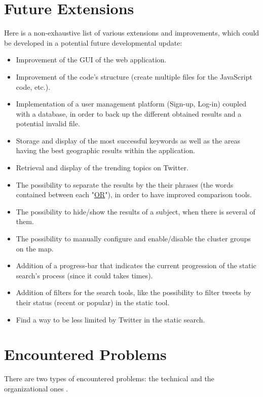 \documentclass[a4paper,11pt]{report}
\begin{document}
\section{Future Extensions}
Here is a non-exhaustive list of various extensions and improvements, which could be developed in a potential future developmental update:
\begin{itemize}
	\item Improvement of the GUI of the web application.
	\item Improvement of the code's structure (create multiple files for the JavaScript code, etc.).
	\item Implementation of a user management platform (Sign-up, Log-in) coupled with a database, in order to back up the different obtained results and a potential invalid file.
	\item Storage and display of the most successful keywords as well as the areas having the best geographic results within the application.
	\item Retrieval and display of the trending topics on Twitter.
	\item The possibility to separate the results by the their phrases (the words contained between each "\underline{OR}"), in order to have improved comparison tools.
	\item The possibility to hide/show the results of a subject, when there is several of them.
	\item The possibility to manually configure and enable/disable the cluster groups on the map.
	\item Addition of a progress-bar that indicates the current progression of the static search's process (since it could takes times).
	\item Addition of filters for the search tools, like the possibility to filter tweets by their status (recent or popular) in the static tool.
	\item Find a way to be less limited by Twitter in the static search.
\end{itemize}

\section{Encountered Problems}
There are two types of encountered problems: the technical and the organizational ones
.
\end{document}
